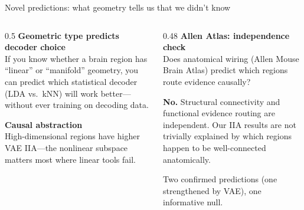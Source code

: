 \documentclass[aspectratio=169,11pt]{beamer}
\begin{document}
\begin{frame}{Novel predictions: what geometry tells us that we didn't know}
\begin{columns}[T]
\begin{column}{0.5\textwidth}
\textbf{Geometric type predicts decoder choice}\\[0.3em]
{\small If you know whether a brain region has ``linear'' or ``manifold'' geometry, you can predict which statistical decoder (LDA vs.\ kNN) will work better---without ever training on decoding data.}

\vspace{0.3em}

\vspace{0.8em}
\textbf{Causal abstraction}\\[0.3em]
{\small High-dimensional regions have higher VAE IIA---the nonlinear subspace matters most where linear tools fail.}

\vspace{0.3em}
\end{column}
\begin{column}{0.48\textwidth}
\textbf{Allen Atlas: independence check}\\[0.3em]
{\small Does anatomical wiring (Allen Mouse Brain Atlas) predict which regions route evidence causally?}

\vspace{0.3em}

\vspace{0.5em}
{\small \textbf{No.} Structural connectivity and functional evidence routing are independent. Our IIA results are not trivially explained by which regions happen to be well-connected anatomically.}

\vspace{0.3em}
{\small Two confirmed predictions (one strengthened by VAE), one informative null.}
\end{column}
\end{columns}
\end{frame}
\end{document}
